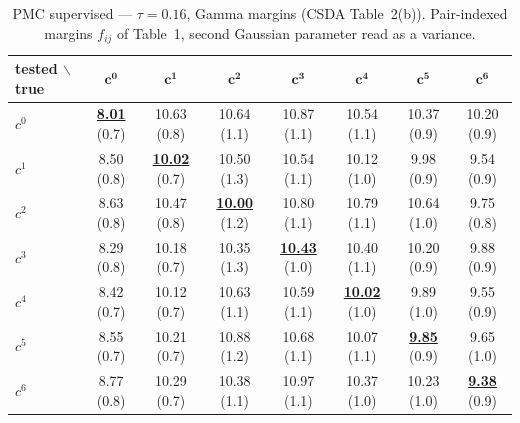 \begin{table}[htbp]
  \centering
  \small
  \setlength{\tabcolsep}{4pt}
  \caption{PMC supervised — $\tau = 0.16$, Gamma margins (CSDA Table~2(b)). Pair-indexed margins $f_{ij}$ of Table~1, second Gaussian parameter read as a variance.}
  \label{tab:exp1-low_tau_gamma}
  \begin{tabular}{lccccccc}
    \toprule
    tested $\backslash$ true & $\mathbf{c^{0}}$ & $\mathbf{c^{1}}$ & $\mathbf{c^{2}}$ & $\mathbf{c^{3}}$ & $\mathbf{c^{4}}$ & $\mathbf{c^{5}}$ & $\mathbf{c^{6}}$ \\
    \midrule
    $c^{0}$ & \textbf{\underline{8.01}} (0.7) & 10.63 (0.8) & 10.64 (1.1) & 10.87 (1.1) & 10.54 (1.1) & 10.37 (0.9) & 10.20 (0.9) \\
    $c^{1}$ & 8.50 (0.8) & \textbf{\underline{10.02}} (0.7) & 10.50 (1.3) & 10.54 (1.1) & 10.12 (1.0) & 9.98 (0.9) & 9.54 (0.9) \\
    $c^{2}$ & 8.63 (0.8) & 10.47 (0.8) & \textbf{\underline{10.00}} (1.2) & 10.80 (1.1) & 10.79 (1.1) & 10.64 (1.0) & 9.75 (0.8) \\
    $c^{3}$ & 8.29 (0.8) & 10.18 (0.7) & 10.35 (1.3) & \textbf{\underline{10.43}} (1.0) & 10.40 (1.1) & 10.20 (0.9) & 9.88 (0.9) \\
    $c^{4}$ & 8.42 (0.7) & 10.12 (0.7) & 10.63 (1.1) & 10.59 (1.1) & \textbf{\underline{10.02}} (1.0) & 9.89 (1.0) & 9.55 (0.9) \\
    $c^{5}$ & 8.55 (0.7) & 10.21 (0.7) & 10.88 (1.2) & 10.68 (1.1) & 10.07 (1.1) & \textbf{\underline{9.85}} (0.9) & 9.65 (1.0) \\
    $c^{6}$ & 8.77 (0.8) & 10.29 (0.7) & 10.38 (1.1) & 10.97 (1.1) & 10.37 (1.0) & 10.23 (1.0) & \textbf{\underline{9.38}} (0.9) \\
    \bottomrule
  \end{tabular}
\end{table}
